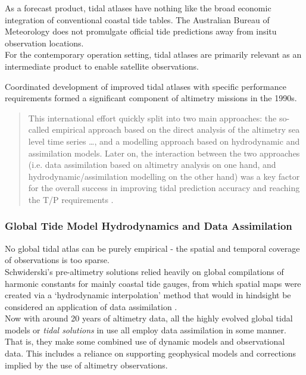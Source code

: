 As a forecast product, tidal atlases have nothing like the broad economic integration of conventional coastal tide tables.  The Australian Bureau of Meteorology does not promulgate official tide predictions away from insitu observation locations. \\
For the contemporary operation setting, tidal atlases are primarily relevant as an intermediate product to enable satellite observations.



Coordinated development of improved tidal atlases with specific performance requirements formed a significant component of altimetry missions in the 1990s.
\begin{quotation}
This international effort quickly split into two main approaches: the so-called empirical approach based on the direct analysis of the altimetry sea level time series \dots{}, and a modelling approach based on hydrodynamic and assimilation models. Later on, the interaction between the two approaches (i.e. data assimilation based on altimetry analysis on one hand, and hydrodynamic/assimilation modelling on the other hand) was a key factor for the overall success in improving tidal prediction accuracy and reaching the T/P requirements \cite[pp394]{Lefevre:2011dg}.
\end{quotation}




\subsubsection{Global Tide Model Hydrodynamics and Data Assimilation}

No global tidal atlas can be purely empirical - the spatial and temporal coverage of observations is too sparse.\\
Schwiderski's pre-altimetry solutions relied heavily on global compilations of harmonic constants for mainly coastal tide gauges, from which spatial maps were created via a `hydrodynamic interpolation' method that would in hindsight be considered an application of data assimilation \cite[pp822]{Egbert:1994wz}.\\
Now with around 20 years of altimetry data, all the highly evolved global tidal models or \emph{tidal solutions} in use all employ data assimilation in some manner.  That is, they make some combined use of dynamic models and observational data.  This includes a reliance on supporting geophysical models and corrections implied by the use of altimetry observations.\\



